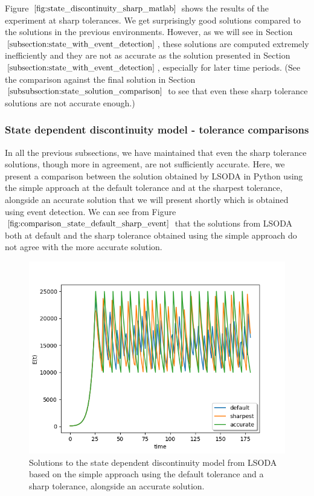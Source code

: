 Figure $\ref{fig:state_discontinuity_sharp_matlab}$ shows the results of the experiment at sharp tolerances. We get surprisingly good solutions compared to the solutions in the previous environments. However, as we will see in Section $\ref{subsection:state_with_event_detection}$, these solutions are computed extremely inefficiently and they are not as accurate as the solution presented in Section $\ref{subsection:state_with_event_detection}$, especially for later time periods. (See the comparison against the final solution in Section $\ref{subsubsection:state_solution_comparison}$ to see that even these sharp tolerance solutions are not accurate enough.)


\subsubsection{State dependent discontinuity model - tolerance comparisons}
\label{subsubsection:state_solution_comparison}
In all the previous subsections, we have maintained that even the sharp tolerance solutions, though more in agreement, are not sufficiently accurate. Here, we present a comparison between the solution obtained by LSODA in Python using the simple approach at the default tolerance and at the sharpest tolerance, alongside an accurate solution that we will present shortly which is obtained using event detection. We can see from Figure $\ref{fig:comparison_state_default_sharp_event}$ that the solutions from LSODA both at default and the sharp tolerance obtained using the simple approach do not agree with the more accurate solution. 

\begin{figure}[H]
\centering
\includegraphics[width=0.7\linewidth]{./figures/comparison_state_default_sharp_event}
\caption{Solutions to the state dependent discontinuity model from LSODA based on the simple approach using the default tolerance and a sharp tolerance, alongside an accurate solution.}
\label{fig:comparison_state_default_sharp_event}
\end{figure}

